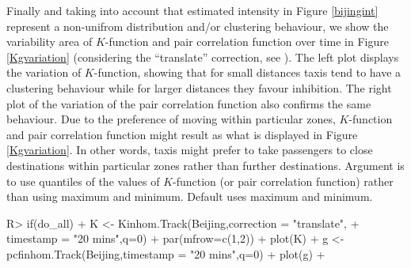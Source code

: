 \documentclass[article]{jss}
\begin{document}
  
  Finally and taking into account that estimated intensity in Figure \ref{bijingint} represent a non-unifrom distribution and/or clustering behaviour, we show the variability area of $K$-function and pair correlation function over time in Figure \ref{Kgvariation} (considering the ``translate'' correction, see \cite{gabriel2014}). The left plot displays the variation of $K$-function, showing that for small distances taxis tend to have a clustering behaviour while for larger distances they favour inhibition. The right plot of the variation of the pair correlation function also confirms the same behaviour. Due to the preference of moving within particular zones, $K$-function and pair correlation function might result as what is displayed in Figure \ref{Kgvariation}. In other words, taxis might prefer to take passengers to close destinations within particular zones rather than further destinations. Argument  is to use quantiles of the values of $K$-function (or pair correlation function) rather than using maximum and minimum. Default  uses maximum and minimum.
\begin{Schunk}
\begin{Sinput}
R>  if(do_all){
+   K <- Kinhom.Track(Beijing,correction = "translate",
+                         timestamp = "20 mins",q=0)
+    par(mfrow=c(1,2))
+    plot(K)
+    g <- pcfinhom.Track(Beijing,timestamp = "20 mins",q=0)
+    plot(g)
+   }
\end{Sinput}
\end{Schunk}
  
\end{document}
